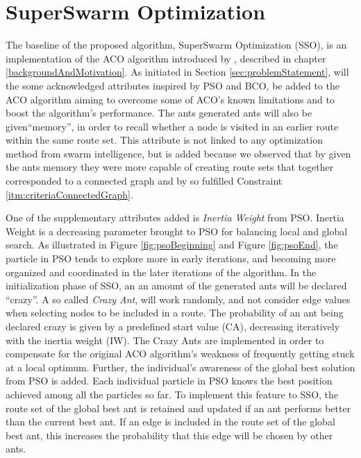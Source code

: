 \section{SuperSwarm Optimization}
\label{section:methodDescription}

The baseline of the proposed algorithm, SuperSwarm Optimization (SSO), is an implementation of the ACO algorithm introduced by \citet{nanda11}, described in chapter \vref{backgroundAndMotivation}. As initiated in Section \vref{sec:problemStatement}, will the some acknowledged attributes inspired by PSO and BCO, be added to the ACO algorithm aiming to overcome some of ACO's known limitations and to boost the algorithm's performance. The ants generated ants will also be given``memory'', in order to recall whether a node is visited in an earlier route within the same route set. This attribute is not linked to any optimization method from swarm intelligence, but is added because we observed that by given the ants memory they were more capable of creating route sets that together corresponded to a connected graph and by so fulfilled Constraint \vref{itm:criteriaConnectedGraph}. 

One of the supplementary attributes added is \textit{Inertia Weight} from PSO. Inertia Weight is a decreasing parameter brought to PSO for balancing local and global search. As illustrated in Figure \vref{fig:psoBeginning} and Figure \vref{fig:psoEnd}, the particle in PSO tends to explore more in early iterations, and becoming more organized and coordinated in the later iterations of the algorithm. In the initialization phase of SSO, an an amount of the generated ants will be declared ``crazy''. A so called \textit{Crazy Ant}, will work randomly, and not consider edge values when selecting nodes to be included in a route. The probability of an ant being declared crazy is given by a predefined start value (CA), decreasing iteratively with the inertia weight (IW). The Crazy Ants are implemented in order to compensate for the original ACO algorithm's weakness of frequently getting stuck at a local optimum. %
Further, the individual's awareness of the global best solution from PSO is added. Each individual particle in PSO knows the best position achieved among all the particles so far. To implement this feature to SSO, the route set of the global best ant is retained and updated if an ant performs better than the current best ant. If an edge is included in the route set of the global best ant, this increases the probability that this edge will be chosen by other ants. 

